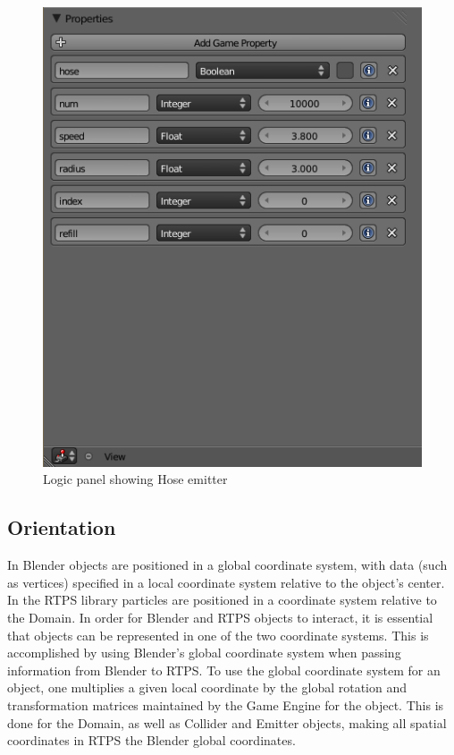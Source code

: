 \begin{figure}[!htc]
 		\centering
		\includegraphics[scale=0.6]{figures/ui_hose.png}
        \caption{ Logic panel showing Hose emitter }
		\label{fig:ui_hose}
\end{figure}
\clearpage

\subsection{Orientation}
In Blender objects are positioned in a global coordinate system, with data
(such as vertices) specified in a local coordinate system relative to the
object's center. In the RTPS library particles are positioned in a coordinate
system relative to the Domain. In order for Blender and RTPS objects to
interact, it is essential that objects can be represented in one of the two
coordinate systems. This is accomplished by using Blender's global coordinate
system when passing information from Blender to RTPS. To use the global
coordinate system for an object, one multiplies a given local coordinate by the
global rotation and transformation matrices maintained by the Game Engine for
the object. This is done for the Domain, as well as Collider and Emitter
objects, making all spatial coordinates in RTPS the Blender global coordinates.

